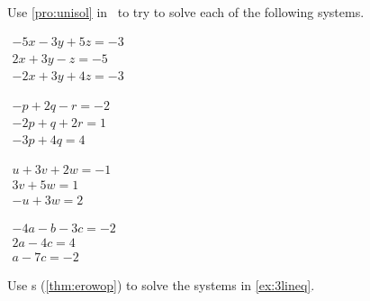 \begin{exercise} \label{ex:3lineq} 
Use \cref{pro:unisol} in \script\ to try to solve each of the following systems.
\begin{Parts}
\item \(\begin{array}{l}
-5x  -3y   +5z=  -3 \\
   2x   +3y  -z = -5\\
  -2x   +3y   +4z=  -3
\end{array}\)

\item \(\begin{array}{l}
-p   +2q  -r=  -2\\
  -2p   +q   +2r=   1\\
  -3p   +4q=   4\end{array}\)

\item \(\begin{array}{l}
u   +3v   +2w=  -1\\
      3v   +5w=   1\\
  -u      +3w=   2\end{array}\)

\begin{reduce}
\item \(\begin{array}{l}
-4a  -b  -3c=  -2\\
   2a    -4c=   4\\
   a     -7c=  -2\end{array}\)
\end{reduce}

%
\end{Parts}
\end{exercise}


\begin{exercise}  
Use s (\cref{thm:erowop}) to solve the systems in \cref{ex:3lineq}.
\end{exercise}





